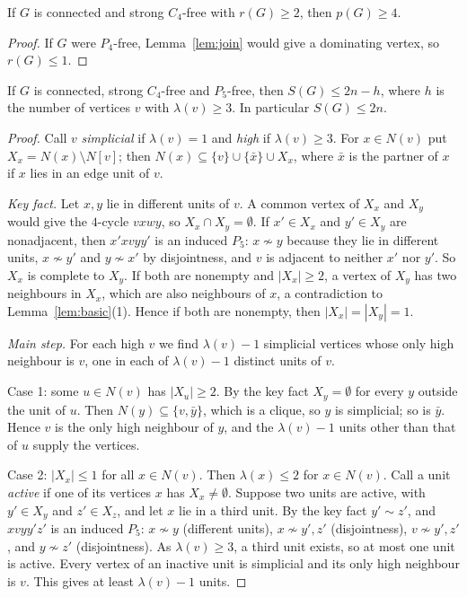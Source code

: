 \documentclass[ASNA]{USG}
\theoremstyle{WBstyletwo}
\numberwithin{equation}{section}
\newcommand{\pp}{p}
\begin{document}
\begin{lemma}\label{lem:r2}
If $G$ is connected and strong $C_4$-free with $r(G)\ge 2$, then $\pp(G)\ge 4$.
\end{lemma}

\begin{proof}
If $G$ were $P_4$-free, Lemma~\ref{lem:join} would give a dominating vertex, so $r(G)\le 1$.
\end{proof}

\begin{lemma}\label{lem:p5}
If $G$ is connected, strong $C_4$-free and $P_5$-free, then $S(G)\le 2n-h$, where $h$ is the number of vertices $v$ with $\lambda(v)\ge 3$. In particular $S(G)\le 2n$.
\end{lemma}

\begin{proof}
Call $v$ \emph{simplicial} if $\lambda(v)=1$ and \emph{high} if $\lambda(v)\ge 3$. For $x\in N(v)$ put $X_x=N(x)\setminus N[v]$; then $N(x)\subseteq\{v\}\cup\{\bar x\}\cup X_x$, where $\bar x$ is the partner of $x$ if $x$ lies in an edge unit of $v$.

\emph{Key fact.} Let $x,y$ lie in different units of $v$. A common vertex of $X_x$ and $X_y$ would give the $4$-cycle $vxwy$, so $X_x\cap X_y=\emptyset$. If $x'\in X_x$ and $y'\in X_y$ are nonadjacent, then $x'xvyy'$ is an induced $P_5$: $x\not\sim y$ because they lie in different units, $x\not\sim y'$ and $y\not\sim x'$ by disjointness, and $v$ is adjacent to neither $x'$ nor $y'$. So $X_x$ is complete to $X_y$. If both are nonempty and $|X_x|\ge 2$, a vertex of $X_y$ has two neighbours in $X_x$, which are also neighbours of $x$, a contradiction to Lemma~\ref{lem:basic}(1). Hence if both are nonempty, then $|X_x|=|X_y|=1$.

\emph{Main step.} For each high $v$ we find $\lambda(v)-1$ simplicial vertices whose only high neighbour is $v$, one in each of $\lambda(v)-1$ distinct units of $v$.

Case 1: some $u\in N(v)$ has $|X_u|\ge 2$. By the key fact $X_y=\emptyset$ for every $y$ outside the unit of $u$. Then $N(y)\subseteq\{v,\bar y\}$, which is a clique, so $y$ is simplicial; so is $\bar y$. Hence $v$ is the only high neighbour of $y$, and the $\lambda(v)-1$ units other than that of $u$ supply the vertices.

Case 2: $|X_x|\le 1$ for all $x\in N(v)$. Then $\lambda(x)\le 2$ for $x\in N(v)$. Call a unit \emph{active} if one of its vertices $x$ has $X_x\ne\emptyset$. Suppose two units are active, with $y'\in X_y$ and $z'\in X_z$, and let $x$ lie in a third unit. By the key fact $y'\sim z'$, and $xvyy'z'$ is an induced $P_5$: $x\not\sim y$ (different units), $x\not\sim y',z'$ (disjointness), $v\not\sim y',z'$, and $y\not\sim z'$ (disjointness). As $\lambda(v)\ge 3$, a third unit exists, so at most one unit is active. Every vertex of an inactive unit is simplicial and its only high neighbour is $v$. This gives at least $\lambda(v)-1$ units.


\end{proof}
\end{document}

